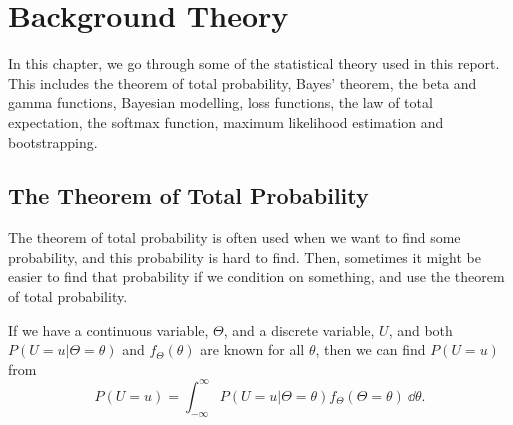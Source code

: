 \newpage
\chapter{Background Theory}
In this chapter, we go through some of the statistical theory used in this report. This includes the theorem of total probability, Bayes' theorem, the beta and gamma functions, Bayesian modelling, loss functions, the law of total expectation, the softmax function, maximum likelihood estimation and bootstrapping.  

\section{The Theorem of Total Probability}
The theorem of total probability is often used when we want to find some probability, and this probability is hard to find. Then, sometimes it might be easier to find that probability if we condition on something, and use the theorem of total probability. 
\begin{theorem}
If we have a continuous variable, $\Theta$, and a discrete variable, $U$, and both $P(U=u|\Theta=\theta)$ and  $f_\Theta(\theta)$ are known for all $\theta$, then we can find $P(U=u)$ from \citep{schay2016introduction} 
\begin{equation}
    \label{lawoftotprob}
    P(U=u) = \int_{-\infty}^{\infty} P(U=u|\Theta=\theta)f_{\Theta}(\Theta=\theta) \: \dd \theta.
\end{equation}
\end{theorem}

\begin{comment}
In \citet{schay2016introduction}, the theorem of total probability for continuous variables is stated as 
\begin{theorem}[Theorem of Total Probability, Continuous Versions]
 For a continuous random variable Y and any event A, if $f_{Y|A}$ and $f_Y$ exists for all y, then
\begin{equation}
    P(A) = \int_{-\infty}^{\infty}
    P(A|Y=y)f_Y(y) dy.
\end{equation}
\end{theorem}
\end{comment}




